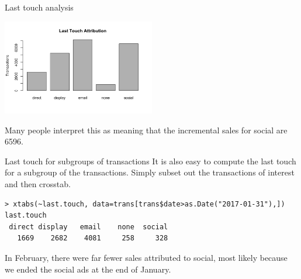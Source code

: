 \documentclass[10pt, aspectratio=169]{beamer}
\begin{document}
\begin{frame}[label=lasttouch]{Last touch analysis}
\begin{center}
\includegraphics[width=0.5\textwidth]{images/lasttouch.png}
\end{center}
\alert{Many people interpret this as meaning that the incremental sales for social are 6596.}
\end{frame} 

\begin{frame}[fragile]{Last touch for subgroups of transactions}
It is also easy to compute the last touch for a subgroup of the transactions. Simply subset out the transactions of interest and then crosstab.
\begin{lstlisting}
> xtabs(~last.touch, data=trans[trans$date>as.Date("2017-01-31"),])
last.touch
 direct display   email    none  social 
   1669    2682    4081     258     328 
\end{lstlisting}
\alert{In February, there were far fewer sales attributed to social, most likely because we ended the social ads at the end of January.}
\end{frame}
\end{document}
